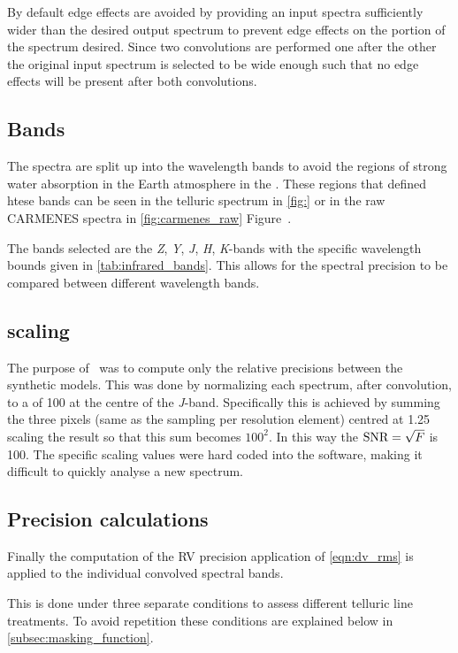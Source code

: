 By default edge effects are avoided by providing an input spectra sufficiently wider than the desired output spectrum to prevent edge effects on the portion of the spectrum desired.
Since two convolutions are performed one after the other the original input spectrum is selected to be wide enough such that no edge effects will be present after both convolutions.

\subsection{Bands}
The spectra are split up into the \nir{} wavelength bands to avoid the regions of strong water absorption in the Earth atmosphere in the \nir{}. These  regions that defined htese bands can be seen in the telluric spectrum in \cref{fig:} or in the raw {CARMENES} spectra in \cref{fig:carmenes_raw} Figure~.

The bands selected are the \emph{Z}, \emph{Y}, \emph{J}, \emph{H}, \emph{K}-bands with the specific wavelength bounds given in \cref{tab:infrared_bands}. This allows for the spectral precision to be compared between different wavelength bands.

\subsection{\snr{} scaling}
The purpose of~\citet{figueira_radial_2016} was to compute only the relative precisions between the synthetic models. This was done by normalizing each spectrum, after convolution, to a \snr{} of 100 at the centre of the \emph{J}-band. Specifically this is achieved by summing the three pixels (same as the sampling per resolution element) centred at 1.25\nm{} scaling the result so that this sum becomes \(100^2\). In this way the \(\textrm{SNR}{} =\sqrt{F}\) is 100. The specific scaling values were hard coded into the software, making it difficult to quickly analyse a new spectrum.

\subsection{Precision calculations}
Finally the computation of the {RV} precision application of \cref{eqn:dv_rms} is applied to the individual convolved spectral bands.

This is done under three separate conditions to assess different telluric line treatments. To avoid repetition these conditions are explained below in \cref{subsec:masking_function}.
